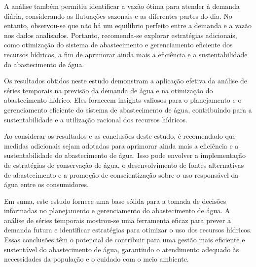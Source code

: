 A análise também permitiu identificar a vazão ótima para atender à demanda diária, considerando as flutuações sazonais e as diferentes partes do dia. No entanto, observou-se que não há um equilíbrio perfeito entre a demanda e a vazão nos dados analisados. Portanto, recomenda-se explorar estratégias adicionais, como otimização do sistema de abastecimento e gerenciamento eficiente dos recursos hídricos, a fim de aprimorar ainda mais a eficiência e a sustentabilidade do abastecimento de água.

Os resultados obtidos neste estudo demonstram a aplicação efetiva da análise de séries temporais na previsão da demanda de água e na otimização do abastecimento hídrico. Eles fornecem insights valiosos para o planejamento e o gerenciamento eficiente do sistema de abastecimento de água, contribuindo para a sustentabilidade e a utilização racional dos recursos hídricos.

Ao considerar os resultados e as conclusões deste estudo, é recomendado que medidas adicionais sejam adotadas para aprimorar ainda mais a eficiência e a sustentabilidade do abastecimento de água. Isso pode envolver a implementação de estratégias de conservação de água, o desenvolvimento de fontes alternativas de abastecimento e a promoção de conscientização sobre o uso responsável da água entre os consumidores.

Em suma, este estudo fornece uma base sólida para a tomada de decisões informadas no planejamento e gerenciamento do abastecimento de água. A análise de séries temporais mostrou-se uma ferramenta eficaz para prever a demanda futura e identificar estratégias para otimizar o uso dos recursos hídricos. Essas conclusões têm o potencial de contribuir para uma gestão mais eficiente e sustentável do abastecimento de água, garantindo o atendimento adequado às necessidades da população e o cuidado com o meio ambiente.


